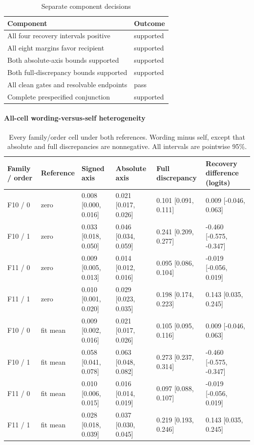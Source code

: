 \begin{table}[htbp]
\centering\footnotesize
\caption{Separate component decisions}
\label{tab:b007-decisions}
\begin{tabularx}{\linewidth}{@{}YY@{}}
\toprule
Component & Outcome \\
\midrule
All four recovery intervals positive & supported \\
All eight margins favor recipient & supported \\
Both absolute-axis bounds supported & supported \\
Both full-discrepancy bounds supported & supported \\
All clean gates and resolvable endpoints & pass \\
Complete prespecified conjunction & supported \\
\bottomrule
\end{tabularx}
\end{table}

\paragraph{All-cell wording-versus-self heterogeneity}

\begin{table}[htbp]
\centering\footnotesize
\caption{Every family/order cell under both references. Wording minus self, except that absolute and full discrepancies are nonnegative. All intervals are pointwise 95\%.}
\label{tab:b007-heterogeneity}
\begin{tabularx}{\linewidth}{@{}YYYYYY@{}}
\toprule
Family / order & Reference & Signed axis & Absolute axis & Full discrepancy & Recovery difference (logits) \\
\midrule
F10 / 0 & zero & 0.008 [0.000, 0.016] & 0.021 [0.017, 0.026] & 0.101 [0.091, 0.111] & 0.009 [-0.046, 0.063] \\
F10 / 1 & zero & 0.033 [0.018, 0.050] & 0.046 [0.034, 0.059] & 0.241 [0.209, 0.277] & -0.460 [-0.575, -0.347] \\
F11 / 0 & zero & 0.009 [0.005, 0.013] & 0.014 [0.012, 0.016] & 0.095 [0.086, 0.104] & -0.019 [-0.056, 0.019] \\
F11 / 1 & zero & 0.010 [0.001, 0.020] & 0.029 [0.023, 0.035] & 0.198 [0.174, 0.223] & 0.143 [0.035, 0.245] \\
F10 / 0 & fit mean & 0.009 [0.002, 0.016] & 0.021 [0.017, 0.026] & 0.105 [0.095, 0.116] & 0.009 [-0.046, 0.063] \\
F10 / 1 & fit mean & 0.058 [0.041, 0.078] & 0.063 [0.048, 0.082] & 0.273 [0.237, 0.314] & -0.460 [-0.575, -0.347] \\
F11 / 0 & fit mean & 0.010 [0.006, 0.015] & 0.016 [0.014, 0.019] & 0.097 [0.088, 0.107] & -0.019 [-0.056, 0.019] \\
F11 / 1 & fit mean & 0.028 [0.018, 0.039] & 0.037 [0.030, 0.045] & 0.219 [0.193, 0.246] & 0.143 [0.035, 0.245] \\
\bottomrule
\end{tabularx}
\end{table}

